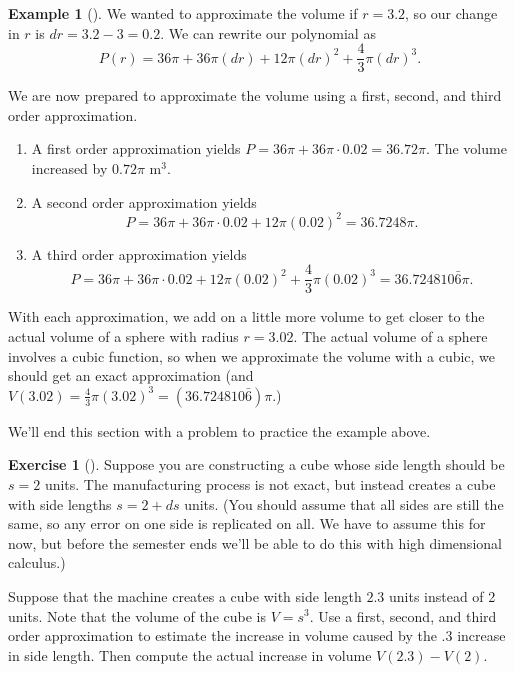 \documentclass[10pt,]{book}
\theoremstyle{plain}
\theoremstyle{definition}
\theoremstyle{definition}
\theoremstyle{definition}
\newtheorem{example}[theorem]{Example}
\theoremstyle{definition}
\newtheorem{exploration}[project]{Exercise}
\theoremstyle{definition}
\numberwithin{equation}{section}
\begin{document}
\begin{example}[]
%
\par
We wanted to approximate the volume if \(r=3.2\), so our change in \(r\) is \(dr=3.2-3=0.2\). We can rewrite our polynomial as%
\begin{equation*}
P(r)=36\pi+36\pi(dr)+12\pi(dr)^2+\frac{4}{3}\pi(dr)^3.
\end{equation*}
%
\par
We are now prepared to approximate the volume using a first, second, and third order approximation. \leavevmode%
\begin{enumerate}
\item\hypertarget{li-12}{}A first order approximation yields \(P=36\pi+ 36\pi\cdot 0.02 =36.72\pi.\) The volume increased by \(0.72\pi\) m\(^3\).%
\item\hypertarget{li-13}{}A second order approximation yields%
\begin{equation*}
P=36\pi+ 36\pi\cdot 0.02 +12\pi (0.02)^2 =36.7248\pi.
\end{equation*}
%
\item\hypertarget{li-14}{}A third order approximation yields%
\begin{equation*}
P=36\pi+36\pi\cdot 0.02 +12\pi (0.02)^2+\frac{4}{3}\pi(0.02)^3  =36.724810\bar6\pi.
\end{equation*}
%
\end{enumerate}
%
\par
With each approximation, we add on a little more volume to get closer to the actual volume of a sphere with radius \(r=3.02\). The actual volume of a sphere involves a cubic function, so when we approximate the volume with a cubic, we should get an exact approximation (and \(V(3.02) = \frac 43 \pi (3.02)^3 =(36.724810\bar6)\pi\).)%
\end{example}
We'll end this section with a problem to practice the example above.%
\begin{exploration}[]\label{exploration-18}
Suppose you are constructing a cube whose side length should be \(s=2\) units. The manufacturing process is not exact, but instead creates a cube with side lengths \(s=2+ds\) units. (You should assume that all sides are still the same, so any error on one side is replicated on all. We have to assume this for now, but before the semester ends we'll be able to do this with high dimensional calculus.)%
\par
Suppose that the machine creates a cube with side length \(2.3\) units instead of 2 units. Note that the volume of the cube is \(V=s^3\). Use a first, second, and third order approximation to estimate the increase in volume caused by the .3 increase in side length. Then compute the actual increase in volume \(V(2.3)-V(2)\).%
\end{exploration}
\typeout{************************************************}
\typeout{************************************************}
\end{document}

